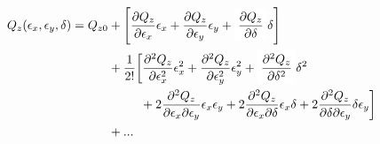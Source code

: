 \begin{equation}
\begin{aligned}
Q_z(\epsilon_x, \epsilon_y, \delta) = Q_{z0} &+ \left[\frac{\partial Q_z}{\partial \epsilon_x} \epsilon_x
                                                 + \frac{\partial Q_z}{\partial \epsilon_y} \epsilon_y
                                                 + \colorbox{yellow!0}{$\displaystyle \frac{\partial Q_z}{\partial \delta}$} \delta
                                                \right] \\
                                             &+ \frac{1}{2!} \biggl[\frac{\partial^2Q_z}{\partial \epsilon_x^2}\epsilon_x^2 
                                                 + \frac{\partial^2Q_z}{\partial \epsilon_y^2}\epsilon_y^2
                                                 + \colorbox{yellow!0}{$\displaystyle \frac{\partial^2 Q_z}{\partial \delta^2}$} \delta^2  \\
                                             &\;\begin{aligned}
                                             \phantom{+ \frac{1}{2!} \biggl[}
                                               &+ 2 \frac{\partial^2Q_z}{\partial \epsilon_x \partial \epsilon_y}\epsilon_x \epsilon_y
                                                  + 2 \frac{\partial^2Q_z}{\partial \epsilon_x \partial \delta}\epsilon_x \delta
                                                  + 2 \frac{\partial^2Q_z}{\partial \delta \partial \epsilon_y} \delta \epsilon_y
                                             \biggr] \\
                                             \end{aligned}  \\
                                             &+ ...

\end{aligned}
\end{equation}
